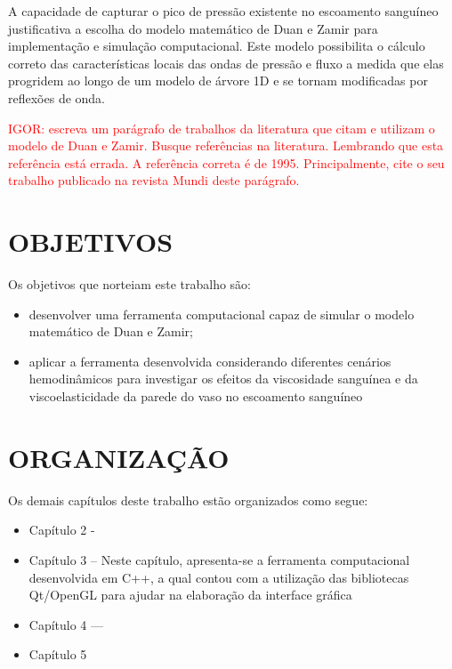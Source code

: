 \documentclass[a4paper,12pt]{monografia}
\theoremstyle{plain}
\theoremstyle{definition}
\theoremstyle{remark}
\begin{document}
A capacidade de capturar o pico de pressão existente no escoamento sanguíneo justificativa a escolha do modelo matemático de Duan e Zamir para implementação e simulação computacional. Este modelo possibilita o cálculo correto das características locais das ondas de pressão e fluxo a medida que elas progridem ao longo de um modelo de árvore 1D e se tornam modificadas por reflexões de onda.

\textcolor{red}{IGOR: escreva um parágrafo de trabalhos da literatura que citam e utilizam o modelo de Duan e Zamir. Busque referências na literatura. Lembrando que esta referência \cite{Duan} está errada. A referência correta é de 1995. Principalmente, cite o seu trabalho publicado na revista Mundi deste parágrafo.}

\section{OBJETIVOS}\label{sec:obj}

Os objetivos que norteiam este trabalho são:
\begin{itemize}
	\item desenvolver uma ferramenta computacional capaz de simular o modelo matemático de Duan e Zamir;
	\item aplicar a ferramenta desenvolvida considerando diferentes cenários hemodinâmicos para investigar os efeitos da viscosidade sanguínea e da viscoelasticidade da parede do vaso no escoamento sanguíneo
\end{itemize}

\section{ORGANIZAÇÃO}\label{sec:org}

Os demais capítulos deste trabalho estão organizados como segue:
\begin{itemize}
	\item Capítulo 2 -
	
	\item Capítulo 3 --
	Neste capítulo, apresenta-se a ferramenta computacional desenvolvida em C++,  a qual contou com a utilização das bibliotecas Qt/OpenGL para ajudar na elaboração da interface gráfica
	\item Capítulo 4 ---
	
	\item Capítulo 5
\end{itemize}
\end{document}
